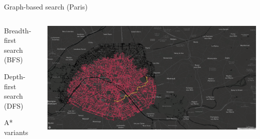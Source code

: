 \documentclass[aspectratio=169]{beamer}
\begin{document}
\begin{frame}[plain]{Graph-based search (Paris)}
  \begin{columns}[T]
      \begin{column}{.4\linewidth}
          \begin{vfilleditems}
              \item {\Large Breadth-first search (BFS)}
              \item {\Large Depth-first search (DFS)}
              \item {\Large A* variants}
          \end{vfilleditems}
      \end{column}
      \begin{column}{.6\linewidth}
      \includegraphics[height=0.9\textheight, keepaspectratio, trim={4cm 0 30cm 0}, clip ]{figures/paris_graph_based.pdf}
      \end{column}
  \end{columns}
\end{frame}
\end{document}
